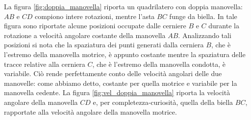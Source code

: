 \noindent La figura \ref{fig:doppia_manovella} riporta un quadrilatero con doppia
manovella: $AB$ e $CD$ compiono intere rotazioni, mentre l'asta $BC$ funge da biella.
In tale figura sono riportate alcune posizioni occupate dalle cerniere $B$ e $C$ 
durante la rotazione a velocit\`a angolare costante della manovella $AB$.
Analizzando tali posizioni si nota che la spaziatura dei punti
generati dalla cerniera $B$, che \`e l'estremo della manovella motrice, \`e appunto
costante mentre la spaziatura delle tracce relative alla cerniera $C$, che \`e l'estremo
della manovella condotta, \`e variabile.
Ci\`o rende perfettamente conto delle velocit\`a angolari delle due manovelle:
come abbiamo detto, costante per quella motrice e variabile per la manovella cedente.
La figura \ref{fig:vel_doppia_manovella} riporta la velocit\`a angolare della manovella
$CD$ e, per completezza-curiosit\`a, quella della biella $BC$, rapportate alla
velocit\`a angolare della manovella motrice. 

